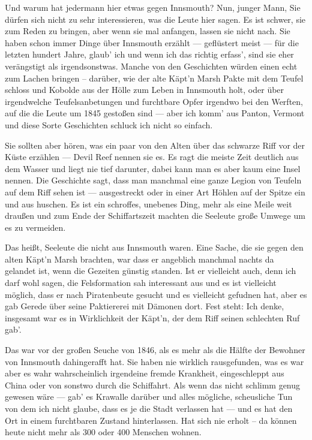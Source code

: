 Und warum hat jedermann hier etwas gegen Innsmouth? Nun, junger Mann, Sie dürfen sich nicht zu sehr interessieren, was die Leute hier sagen. Es ist schwer, sie zum Reden zu bringen, aber wenn sie mal anfangen, lassen sie nicht nach. Sie haben schon immer Dinge über Innsmouth erzählt --- geflüstert meist --- für die letzten hundert Jahre, glaub' ich und wenn ich das richtig erfass', sind sie eher verängstigt als irgendsonstwas. Manche von den Geschichten würden einen echt zum Lachen bringen -- darüber, wie der alte Käpt'n Marsh Pakte mit dem Teufel schloss und Kobolde aus der Hölle zum Leben in Innsmouth holt, oder über irgendwelche Teufelsanbetungen und furchtbare Opfer irgendwo bei den Werften, auf die die Leute um 1845 gestoßen sind --- aber ich komm' aus Panton, Vermont und diese Sorte Geschichten schluck ich nicht so einfach.

Sie sollten aber hören, was ein paar von den Alten über das schwarze Riff vor der Küste erzählen --- Devil Reef nennen sie es. Es ragt die meiste Zeit deutlich aus dem Wasser und liegt nie tief darunter, dabei kann man es aber kaum eine Insel nennen. Die Geschichte sagt, dass man manchmal eine ganze Legion von Teufeln auf dem Riff sehen ist --- ausgestreckt oder in einer Art Höhlen auf der Spitze ein und aus huschen. Es ist ein schroffes, unebenes Ding, mehr als eine Meile weit draußen und zum Ende der Schiffartszeit machten die Seeleute große Umwege um es zu vermeiden.

Das heißt, Seeleute die nicht aus Innsmouth waren. Eine Sache, die sie gegen den alten Käpt'n Marsh brachten, war dass er angeblich manchmal nachts da gelandet ist, wenn die Gezeiten günstig standen. Ist er vielleicht auch, denn ich darf wohl sagen, die Felsformation sah interessant aus und es ist vielleicht möglich, dass er nach Piratenbeute gesucht und es vielleicht gefudnen hat, aber es gab Gerede über seine Paktiererei mit Dämonen dort. Fest steht: Ich denke, insgesamt war es in Wirklichkeit der Käpt'n, der dem Riff seinen schlechten Ruf gab'.

Das war vor der großen Seuche von 1846, als es mehr als die Hälfte der Bewohner von Innsmouth dahingerafft hat. Sie haben nie wirklich rausgefunden, was es war aber es wahr wahrscheinlich irgendeine fremde Krankheit, eingeschleppt aus China oder von sonstwo durch die Schiffahrt. Als wenn das nicht schlimm genug gewesen wäre --- gab' es Krawalle darüber und alles mögliche, scheusliche Tun von dem ich nicht glaube, dass es je die Stadt verlassen hat --- und es hat den Ort in einem furchtbaren Zustand hinterlassen. Hat sich nie erholt -- da können heute nicht mehr als 300 oder 400 Menschen wohnen.

